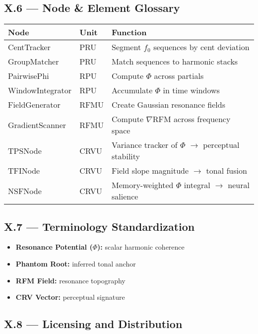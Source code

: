 \subsection*{X.6 — Node \& Element Glossary}

\begin{center}
\begin{tabular}{|l|l|p{7.5cm}|}
\hline
\textbf{Node} & \textbf{Unit} & \textbf{Function} \\
\hline
CentTracker & PRU & Segment $f_0$ sequences by cent deviation \\
GroupMatcher & PRU & Match sequences to harmonic stacks \\
PairwisePhi & RPU & Compute $\Phi$ across partials \\
WindowIntegrator & RPU & Accumulate $\Phi$ in time windows \\
FieldGenerator & RFMU & Create Gaussian resonance fields \\
GradientScanner & RFMU & Compute $\nabla$RFM across frequency space \\
TPSNode & CRVU & Variance tracker of $\Phi$ $\rightarrow$ perceptual stability \\
TFINode & CRVU & Field slope magnitude $\rightarrow$ tonal fusion \\
NSFNode & CRVU & Memory-weighted $\Phi$ integral $\rightarrow$ neural salience \\
\hline
\end{tabular}
\end{center}

\subsection*{X.7 — Terminology Standardization}

\begin{itemize}
    \item \textbf{Resonance Potential ($\Phi$):} scalar harmonic coherence
    \item \textbf{Phantom Root:} inferred tonal anchor
    \item \textbf{RFM Field:} resonance topography
    \item \textbf{CRV Vector:} perceptual signature
\end{itemize}

\subsection*{X.8 — Licensing and Distribution}


